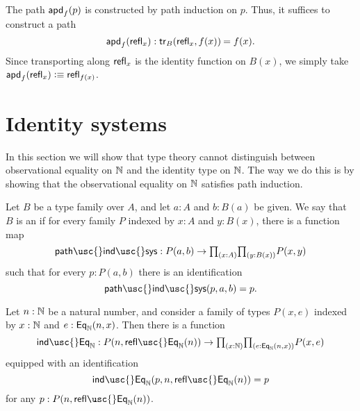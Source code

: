 \begin{constr}
The path $\mathsf{apd}_{f}\mathopen{}\left(p\right)\mathclose{}$ is constructed by path induction on $p$. Thus, it suffices to construct a path
\begin{equation*}
\apd{f}{\refl{x}}:\id{\mathsf{tr}_B(\refl{x},f(x))}{f(x)}.
\end{equation*}
Since transporting along $\mathsf{refl}_{x}$ is the identity function on $B(x)$, we simply take $\mathsf{apd}_{f}\mathopen{}\left(\mathsf{refl}_{x}\right)\mathclose{}\vcentcolon\equiv\mathsf{refl}_{f(x)}$. 
\end{constr}

%

\section{Identity systems}

In this section we will show that type theory cannot distinguish between observational equality on $\mathbb{N}$ and the identity type on $\mathbb{N}$. The way we do this is by showing that the observational equality on $\mathbb{N}$ satisfies path induction.

\begin{defn}
  Let $B$ be a type family over $A$, and let $a:A$ and $b:B(a)$ be given. We say that $B$ is an  if for every family $P$ indexed by $x:A$ and $y:B(x)$, there is a function map
  \begin{equation*}
    \mathsf{path\usc{}ind\usc{}sys}:P(a,b)\to \prd{x:A}{y:B(x)}P(x,y)
  \end{equation*}
  such that for every $p:P(a,b)$ there is an identification
  \begin{equation*}
    \mathsf{path\usc{}ind\usc{}sys}(p,a,b)=p.
  \end{equation*}
\end{defn}

\begin{thm}
  Let $n:\mathbb{N}$ be a natural number, and consider a family of types $P(x,e)$ indexed by $x:\mathbb{N}$ and $e:\mathsf{Eq}_\mathbb{N}(n,x)$. Then there is a function
  \begin{equation*}
    \mathsf{ind\usc{}Eq}_\N:P(n,\mathsf{refl\usc{}Eq}_\N(n))\to\prd{x:\N}{e:\EqN(n,x)}P(x,e)
  \end{equation*}
  equipped with an identification
  \begin{equation*}
    \mathsf{ind\usc{}Eq}_\N(p,n,\mathsf{refl\usc{}Eq}_\N(n))= p
  \end{equation*}
  for any $p:P(n,\mathsf{refl\usc{}Eq}_\N(n))$.
\end{thm}

